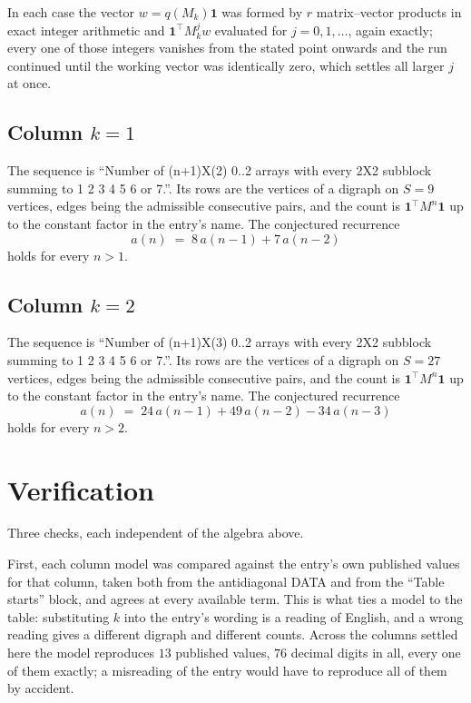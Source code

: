 \documentclass[11pt,a4paper]{article}
\theoremstyle{plain}
\theoremstyle{definition}
\begin{document}
In each case the vector $w=q(M_k)\mathbf{1}$ was formed by $r$ matrix--vector products in
exact integer arithmetic and $\mathbf{1}^{\!\top}M_k^{j}w$ evaluated for $j=0,1,\dots$,
again exactly; every one of those integers vanishes from the stated point onwards and the run
continued until the working vector was identically zero, which settles all larger $j$ at once.

\subsection*{Column $k=1$}
The sequence is ``Number of (n+1)X(2) 0..2 arrays with every 2X2 subblock summing to 1 2 3 4 5 6 or 7.''. Its rows are the vertices of a digraph on
$S=9$ vertices, edges being the admissible consecutive pairs, and the count is
$\mathbf{1}^{\!\top}M^{n}\mathbf{1}$ up to the constant factor in the entry's name.
The conjectured recurrence
\[
a(n)\;=\;8\,a(n-1) + 7\,a(n-2)
\]
holds for every $n>1$.

\subsection*{Column $k=2$}
The sequence is ``Number of (n+1)X(3) 0..2 arrays with every 2X2 subblock summing to 1 2 3 4 5 6 or 7.''. Its rows are the vertices of a digraph on
$S=27$ vertices, edges being the admissible consecutive pairs, and the count is
$\mathbf{1}^{\!\top}M^{n}\mathbf{1}$ up to the constant factor in the entry's name.
The conjectured recurrence
\[
a(n)\;=\;24\,a(n-1) + 49\,a(n-2) - 34\,a(n-3)
\]
holds for every $n>2$.

\section{Verification}

Three checks, each independent of the algebra above.

First, each column model was compared against the entry's own published values for that
column, taken both from the antidiagonal DATA and from the ``Table starts'' block, and agrees
at every available term. This is what ties a model to the table: substituting $k$ into the
entry's wording is a reading of English, and a wrong reading gives a different digraph and
different counts. Across the columns settled here the model reproduces $13$ published
values, $76$ decimal digits in all, every one of them exactly; a misreading of the entry
would have to reproduce all of them by accident.
\end{document}
